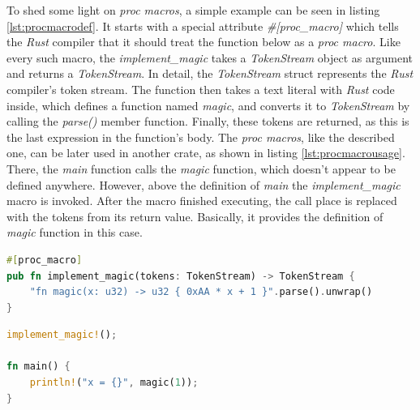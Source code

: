 To shed some light on \textit{proc macros}, a simple example can be seen in listing \ref{lst:procmacrodef}. It starts with a special attribute \textit{\#[proc\_macro]} which tells the \textit{Rust} compiler that it should treat the function below as a \textit{proc macro}. Like every such macro, the \textit{implement\_magic} takes a \textit{TokenStream} object as argument and returns a \textit{TokenStream}. In detail, the \textit{TokenStream} struct represents the \textit{Rust} compiler's token stream. The function then takes a text literal with \textit{Rust} code inside, which defines a function named \textit{magic}, and converts it to \textit{TokenStream} by calling the \textit{parse()} member function. Finally, these tokens are returned, as this is the last expression in the function's body. The \textit{proc macros}, like the described one, can be later used in another crate, as shown in listing \ref{lst:procmacrousage}. There, the \textit{main} function calls the \textit{magic} function, which doesn't appear to be defined anywhere. However, above the definition of \textit{main} the \textit{implement\_magic} macro is invoked. After the macro finished executing, the call place is replaced with the tokens from its return value. Basically, it provides the definition of \textit{magic} function in this case.

\begin{minipage}{\linewidth}
\begin{lstlisting}[language=rust,caption={Example of a \textit{proc macro} definition.},label={lst:procmacrodef}]
#[proc_macro]
pub fn implement_magic(tokens: TokenStream) -> TokenStream {
    "fn magic(x: u32) -> u32 { 0xAA * x + 1 }".parse().unwrap()
}
\end{lstlisting}
\end{minipage}

\begin{minipage}{\linewidth}
\begin{lstlisting}[language=rust,caption={Example usage of a \textit{proc macro}.},label={lst:procmacrousage}]
implement_magic!();

fn main() {
    println!("x = {}", magic(1));
}
\end{lstlisting}
\end{minipage}

